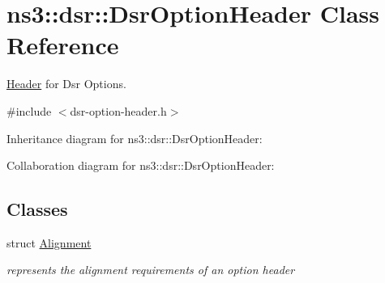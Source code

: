 \hypertarget{classns3_1_1dsr_1_1DsrOptionHeader}{}\section{ns3\+:\+:dsr\+:\+:Dsr\+Option\+Header Class Reference}
\label{classns3_1_1dsr_1_1DsrOptionHeader}


\hyperlink{classns3_1_1Header}{Header} for Dsr Options.  




{\ttfamily \#include $<$dsr-\/option-\/header.\+h$>$}



Inheritance diagram for ns3\+:\+:dsr\+:\+:Dsr\+Option\+Header\+:


Collaboration diagram for ns3\+:\+:dsr\+:\+:Dsr\+Option\+Header\+:
\subsection*{Classes}
\begin{DoxyCompactItemize}
\item 
struct \hyperlink{structns3_1_1dsr_1_1DsrOptionHeader_1_1Alignment}{Alignment}
\begin{DoxyCompactList}\small\item\em represents the alignment requirements of an option header \end{DoxyCompactList}\end{DoxyCompactItemize}

